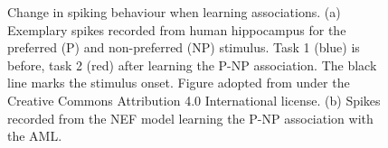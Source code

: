 \begin{figure}
    \centering

    \vspace*{0.5cm}
    \caption[Change in spiking behaviour when learning associations]{Change in spiking behaviour when learning associations. (a) Exemplary spikes recorded from human hippocampus for the preferred (P) and non-preferred (NP) stimulus. Task 1 (blue) is before, task 2 (red) after learning the P-NP association. The black line marks the stimulus onset. Figure adopted from \textcite{ison2015} under the Creative Commons Attribution 4.0 International license. (b) Spikes recorded from the NEF model learning the P-NP association with the AML\@.}\label{fig:aml-spikes}
\end{figure}
